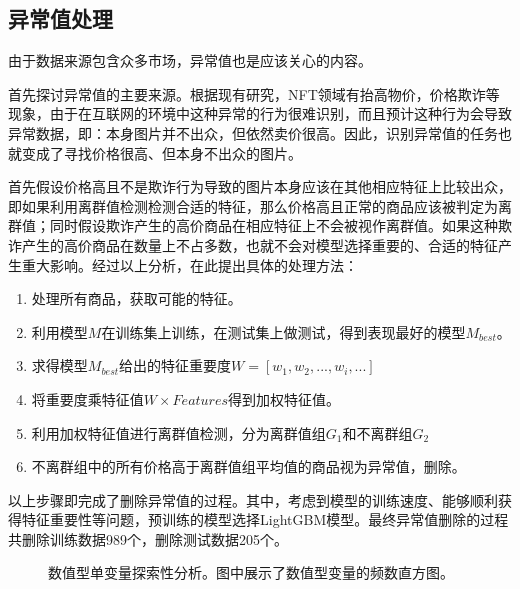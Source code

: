 \documentclass{article}
\begin{document}
\subsection{异常值处理}
由于数据来源包含众多市场，异常值也是应该关心的内容。
\par 首先探讨异常值的主要来源。根据现有研究\cite{Dowling2022Jan}，NFT领域有抬高物价，价格欺诈等现象，由于在互联网的环境中这种异常的行为很难识别，而且预计这种行为会导致异常数据，即：本身图片并不出众，但依然卖价很高。因此，识别异常值的任务也就变成了寻找价格很高、但本身不出众的图片。
\par 首先假设价格高且不是欺诈行为导致的图片本身应该在其他相应特征上比较出众，即如果利用离群值检测检测合适的特征，那么价格高且正常的商品应该被判定为离群值；同时假设欺诈产生的高价商品在相应特征上不会被视作离群值。如果这种欺诈产生的高价商品在数量上不占多数，也就不会对模型选择重要的、合适的特征产生重大影响。经过以上分析，在此提出具体的处理方法：
\begin{enumerate}
	\item 处理所有商品，获取可能的特征。
	\item 利用模型$M$在训练集上训练，在测试集上做测试，得到表现最好的模型$M_{best}$。
	\item 求得模型$M_{best}$给出的特征重要度$W=[w_1,w_2,...,w_i,...]$
	\item 将重要度乘特征值$W\times Features$得到加权特征值。
	\item 利用加权特征值进行离群值检测，分为离群值组$G_1$和不离群组$G_2$
	\item 不离群组中的所有价格高于离群值组平均值的商品视为异常值，删除。
\end{enumerate}
\par 以上步骤即完成了删除异常值的过程。其中，考虑到模型的训练速度、能够顺利获得特征重要性等问题，预训练的模型选择LightGBM模型。最终异常值删除的过程共删除训练数据989个，删除测试数据205个。
\begin{figure}[!htbp]
	\centering
	\caption{数值型单变量探索性分析。图中展示了数值型变量的频数直方图。}
	\label{图：单变量-频数直方图}
\end{figure}
\end{document}
